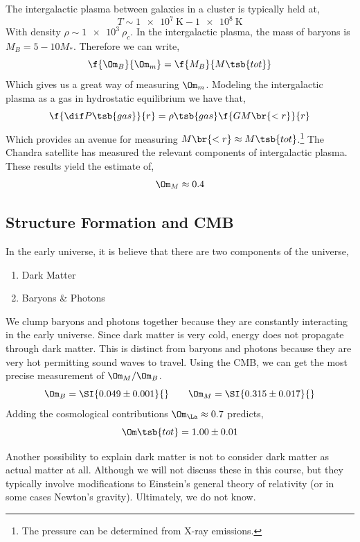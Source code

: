 \documentclass{article}
\begin{document}
The intergalactic plasma between galaxies in a cluster is typically held at,
\[ T \sim \SI{1e7}{\K} - \SI{1e8}{\K} \]
With density $\rho \sim \SI{1e3}{}\rho_c$. In the intergalactic plasma, the mass of baryons is $M_B = 5-10 M_{*}$. Therefore we can write,
\[ \f{\Om_B}{\Om_m} = \f{M_B}{M\tsb{tot}} \]
Which gives us a great way of measuring $\Om_m$. Modeling the intergalactic plasma as a gas in hydrostatic equilibrium we have that,
\[ \f{\dif P\tsb{gas}}{r} = \rho\tsb{gas} \f{GM\br{<r}}{r} \]
Which provides an avenue for measuring $M\br{<r} \approx M\tsb{tot}$.\footnote{The pressure can be determined from X-ray emissions.} The Chandra satellite has measured the relevant components of intergalactic plasma. These results yield the estimate of,
\[ \Om_M \approx 0.4 \]

\subsection{Structure Formation and CMB}

In the early universe, it is believe that there are two components of the universe,
\begin{enumerate}
    \item Dark Matter
    \item Baryons \& Photons
\end{enumerate}
We clump baryons and photons together because they are constantly interacting in the early universe. Since dark matter is very cold, energy does not propagate through dark matter. This is distinct from baryons and photons because they are very hot permitting sound waves to travel. Using the CMB, we can get the most precise measurement of $\Om_M / \Om_B$.
\[ \Om_B = \SI{0.049\pm0.001}{} \qquad \Om_M = \SI{0.315\pm0.017}{} \]
Adding the cosmological contributions $\Om_{\La} \approx 0.7$ predicts,
\[ \Om\tsb{tot} = 1.00 \pm 0.01 \]

Another possibility to explain dark matter is not to consider dark matter as actual matter at all. Although we will not discuss these in this course, but they typically involve modifications to Einstein's general theory of relativity (or in some cases Newton's gravity). Ultimately, we do not know.
\end{document}
